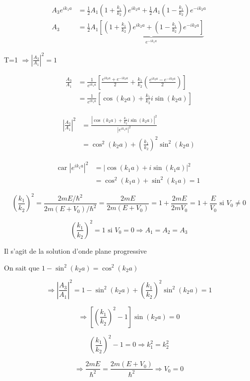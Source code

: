 \documentclass[12pt,a4paper]{article}
\begin{document}
\begin{align*}
A_3 e^{ik_1a} &= \frac{1}{2}A_1\left(1+\frac{k_1}{k_2}\right)e^{ik_2a} + \frac{1}{2}A_1\left(1-\frac{k_1}{k_2}\right)e^{-ik_2a} \\
A_3 &= \frac{1}{2}A_1\underbrace{\left[\left(1+\frac{k_1}{k_2}\right)e^{ik_2a} + \left(1-\frac{k_1}{k_2}\right)e^{-ik_2a}\right]}_{e^{-ik_1a}}
\end{align*}

 T=1 $\Rightarrow \left|\frac{A_3}{A_1}\right|^2 = 1$

\begin{align*}
\frac{A_3}{A_1} &= \frac{1}{e^{ik_1a}}\left[\frac{e^{ik_2a}+e^{-ik_2a}}{2} + \frac{k_1}{k_2}\left(\frac{e^{ik_2a}-e^{-ik_2a}}{2}\right)\right] \\
&= \frac{1}{e^{ik_1a}}\left[\cos(k_2a) + \frac{k_1}{k_2}i\sin(k_2a)\right]
\end{align*}

\begin{align*}
\left|\frac{A_3}{A_1}\right|^2 &= \frac{\left|\cos(k_2a) + \frac{k_1}{k_2}i\sin(k_2a)\right|^2}{|e^{ik_1a}|^2} \\
&= \cos^2(k_2a) + \left(\frac{k_1}{k_2}\right)^2\sin^2(k_2a)
\end{align*}

\begin{align*}
\text{car }|e^{ik_1a}|^2 &= |\cos(k_1a) + i\sin(k_1a)|^2 \\
&= \cos^2(k_1a) + \sin^2(k_1a) = 1
\end{align*}



\[
\left(\frac{k_1}{k_2}\right)^2 = \frac{2mE/\hbar^2}{2m(E+V_0)/\hbar^2} = \frac{2mE}{2m(E+V_0)} = 1+ \frac{2mE}{2mV_0} = 1+ \frac{E}{V_0} \text{ si } V_0 \neq 0
\]

\[
\left(\frac{k_1}{k_2}\right)^2 = 1 \text{ si } V_0 = 0 \Rightarrow A_1 = A_2 = A_3
\]

Il s'agit de la solution d'onde plane progressive

On sait que $1-\sin^2(k_2 a) = \cos^2(k_2 a)$

\[
\Rightarrow \left|\frac{A_3}{A_1}\right|^2 = 1-\sin^2(k_2 a) + \left(\frac{k_1}{k_2}\right)^2\sin^2(k_2 a) = 1
\]

\[
\Rightarrow \left[\left(\frac{k_1}{k_2}\right)^2 - 1\right]\sin(k_2 a) = 0
\]

\[
\left(\frac{k_1}{k_2}\right)^2 - 1 = 0 \Rightarrow k_1^2 = k_2^2
\]

\[
\Rightarrow \frac{2mE}{\hbar^2} = \frac{2m(E+V_0)}{\hbar^2} \Rightarrow V_0 = 0
\]
\end{document}

